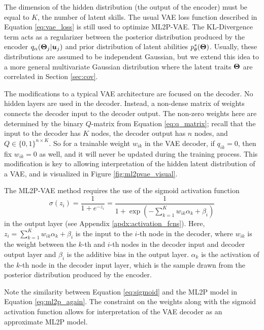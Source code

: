 The dimension of the hidden distribution (the output of the encoder) must be equal to $K$, the number of latent skills. The usual VAE loss function described in Equation \ref{eq:vae_loss} is still used to optimize ML2P-VAE. The KL-Divergence term acts as a regularizer between the posterior distribution produced by the encoder $q_\alpha(\boldsymbol{\Theta}_j | \boldsymbol{u}_j)$ and prior distribution of latent abilities $p_\theta^*(\boldsymbol{\Theta})$. Usually, these distributions are assumed to be independent Gaussian, but we extend this idea to a more general multivariate Gaussian distribution where the latent traits $\boldsymbol{\Theta}$ are correlated in Section \ref{sec:cov}.

The modifications to a typical VAE architecture are focused on the decoder. No hidden layers are used in the decoder. Instead, a non-dense matrix of weights connects the decoder input to the decoder output. The non-zero weights here are determined by the binary $Q$-matrix from Equation \ref{eq:q_matrix}; recall that the input to the decoder has $K$ nodes, the decoder output has $n$ nodes, and $Q \in \{0,1\}^{n \times K}$. So for a trainable weight $w_{ik}$ in the VAE decoder, if $q_{ik}=0$, then fix $w_{ik}=0$ as well, and it will never be updated during the training process. This modification is key to allowing interpretation of the hidden latent distribution of a VAE, and is visualized in Figure \ref{fig:ml2pvae_visual}.

The ML2P-VAE method requires the use of the sigmoid activation function
\begin{equation}
  \sigma(z_i) = \frac{1}{1 + e^{-z_i}} = \frac{1}{1 + \exp\left(- \sum_{k=1}^K w_{ik} \alpha_k + \beta_i \right)}
  \label{eq:sigmoid}
\end{equation}
in the output layer (see Appendix \ref{apdx:activation_fcns}). Here, $z_i = \sum_{k=1}^K w_{ik}\alpha_{k} + \beta_i$ is the input to the $i$-th node in the decoder, where $w_{ik}$ is the weight between the $k$-th and $i$-th nodes in the decoder input and decoder output layer and $\beta_i$ is the additive bias in the output layer. $\alpha_k$ is the activation of the $k$-th node in the decoder input layer, which is the sample drawn from the posterior distribution produced by the encoder. 

Note the similarity between Equation \ref{eq:sigmoid} and the ML2P model in Equation \ref{eq:ml2p_again}. The constraint on the weights along with the sigmoid activation function allows for interpretation of the VAE decoder as an approximate ML2P model.


